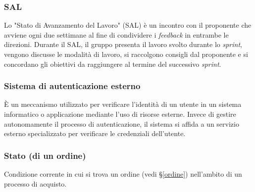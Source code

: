 
\subsubsection*{SAL}
Lo "Stato di Avanzamento del Lavoro" (SAL) è un incontro con il proponente che avviene ogni due settimane al fine di condividere i \textit{feedback} in entrambe le direzioni. 
Durante il SAL, il gruppo presenta il lavoro svolto durante lo \textit{sprint}, vengono discusse le modalità di lavoro, si raccolgono consigli dal proponente e si concordano gli obiettivi da raggiungere al termine del successivo \textit{sprint}.

\subsubsection*{Sistema di autenticazione esterno}
È un meccanismo utilizzato per verificare l'identità di un utente in un sistema informatico o applicazione mediante l'uso di risorse esterne. 
Invece di gestire autonomamente il processo di autenticazione, il sistema si affida a un servizio esterno specializzato per verificare le credenziali dell'utente.

\subsubsection*{Stato (di un ordine)}
Condizione corrente in cui si trova un ordine (vedi \S\ref{ordine}) nell'ambito
di un processo di acquisto.

\newpage
